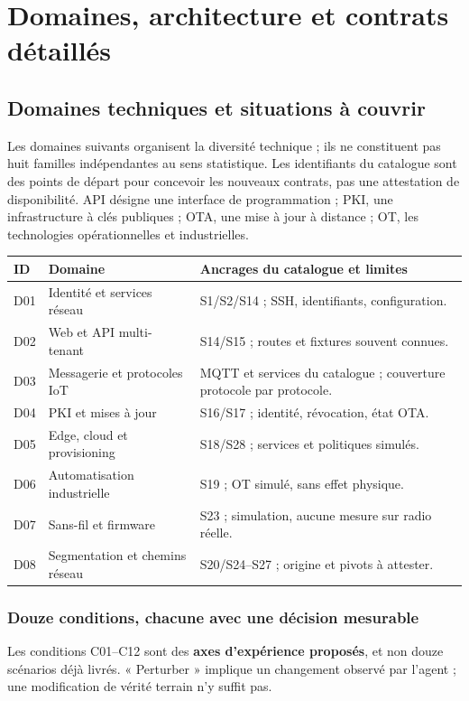 \documentclass[11pt,a4paper]{article}
\begin{document}
\section{Domaines, architecture et contrats détaillés}
\subsection{Domaines techniques et situations à couvrir}
\label{sec:matrix}
Les domaines suivants organisent la diversité technique ; ils ne constituent pas huit familles indépendantes au sens statistique. Les identifiants du catalogue sont des points de départ pour concevoir les nouveaux contrats, pas une attestation de disponibilité. API désigne une interface de programmation ; PKI, une infrastructure à clés publiques ; OTA, une mise à jour à distance ; OT, les technologies opérationnelles et industrielles.

\small

\begin{tabularx}{\textwidth}{@{}P{10mm}P{62mm}Y@{}}\toprule
ID & Domaine & Ancrages du catalogue et limites\\\midrule
D01 & Identité et services réseau & S1/S2/S14 ; SSH, identifiants, configuration.\\
D02 & Web et API multi-tenant & S14/S15 ; routes et fixtures souvent connues.\\
D03 & Messagerie et protocoles IoT & MQTT et services du catalogue ; couverture protocole par protocole.\\
D04 & PKI et mises à jour & S16/S17 ; identité, révocation, état OTA.\\
D05 & Edge, cloud et provisioning & S18/S28 ; services et politiques simulés.\\
D06 & Automatisation industrielle & S19 ; OT simulé, sans effet physique.\\
D07 & Sans-fil et firmware & S23 ; simulation, aucune mesure sur radio réelle.\\
D08 & Segmentation et chemins réseau & S20/S24--S27 ; origine et pivots à attester.\\\bottomrule
\end{tabularx}
\normalsize

\subsubsection{Douze conditions, chacune avec une décision mesurable}
Les conditions C01--C12 sont des \textbf{axes d'expérience proposés}, et non douze scénarios déjà livrés. « Perturber » implique un changement observé par l'agent ; une modification de vérité terrain n'y suffit pas.
\end{document}
